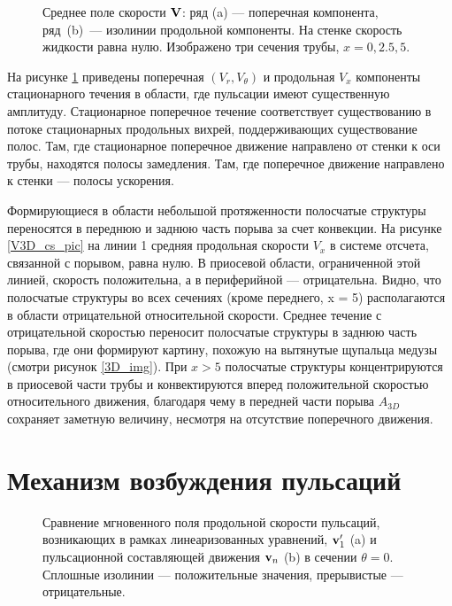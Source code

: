 \begin{figure}[h]
\caption{Среднее поле скорости $\mathbf{V}$: ряд (a) --- поперечная компонента, ряд~(b)~--- изолинии продольной компоненты. На стенке скорость жидкости равна нулю. Изображено три сечения трубы, $x = 0, 2.5, 5$.}
\label{VEL_cs_pic}
\end{figure}

На рисунке \ref{VEL_cs_pic} приведены поперечная $(V_r, V_\theta)$ и продольная $V_x$ компоненты стационарного течения в области, где пульсации имеют существенную амплитуду. Стационарное поперечное течение соответствует существованию в потоке стационарных продольных вихрей, поддерживающих существование полос. Там, где стационарное поперечное движение направлено от стенки к оси трубы, находятся полосы замедления. Там, где поперечное движение направлено к стенки --- полосы ускорения. 

Формирующиеся в области небольшой протяженности полосчатые структуры переносятся в переднюю и заднюю часть порыва за счет конвекции. На рисунке \ref{V3D_cs_pic} на линии 1 средняя продольная скорости $V_x$ в системе отсчета, связанной с порывом, равна нулю. В приосевой области, ограниченной этой линией, скорость положительна, а в периферийной --- отрицательна. Видно, что полосчатые структуры во всех сечениях (кроме переднего, x = 5) располагаются в области отрицательной относительной скорости. Среднее течение с отрицательной скоростью переносит полосчатые структуры в заднюю часть порыва, где они формируют картину, похожую на вытянутые щупальца медузы (смотри рисунок \ref{3D_img}). При $x > 5$ полосчатые структуры концентрируются в приосевой части трубы и конвектируются вперед положительной скоростью относительного движения, благодаря чему в передней части порыва $A_{3D}$ сохраняет заметную величину, несмотря на отсутствие поперечного движения.


\section{Механизм возбуждения пульсаций}

\begin{figure}
\caption{Сравнение мгновенного поля продольной скорости пульсаций, возникающих в рамках линеаризованных уравнений, $\mathbf{v}'_1$ (a) и пульсационной составляющей движения $\mathbf{v}_n$ (b) в сечении $\theta = 0$. Сплошные изолинии --- положительные значения, прерывистые --- отрицательные.}
\label{lin_ls_cmp_pic}
\end{figure}

